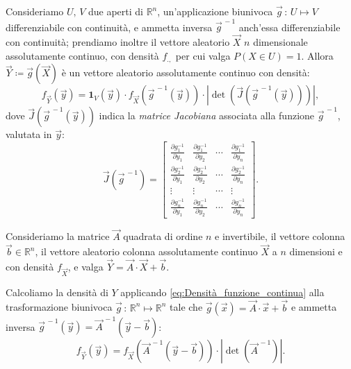         \begin{prty}\label{prty:Densità_funzione_continua}
            Consideriamo $U,\,V$ due aperti di $\mathbb{R}^n$, 
            un'applicazione biunivoca $\vec{g}\,:\, U \mapsto V$ differenziabile con continuità, 
            e ammetta inversa $\vec{g}^{\,-1}$ anch'essa differenziabile con continuità; 
            prendiamo inoltre il vettore aleatorio $\vec{X}$ $n$ \nbdash dimensionale assolutamente continuo, 
            con densità $f_{.,}$ per cui valga $P(X \in U) = 1$. Allora $\vec{Y} \coloneqq \vec{g}(\vec{X})$ è un
            vettore aleatorio assolutamente continuo con densità:
            \begin{equation}\label{eq:Densità_funzione_continua}
                f_{\vec{Y}}(\vec{y}) = \mathbf{1}_{V}(\vec{y}) \cdot 
                f_{\vec{X}}\left(\vec{g}^{\,-1}(\vec{y})\right) \cdot 
                \left|\det\left(\vec{J}\left(\vec{g}^{\,-1}(\vec{y})\right)\right)\right|
            ,\end{equation}
            dove $\vec{J}(\vec{g}^{\,-1}(\vec{y}))$ indica la \textit{matrice Jacobiana} associata alla 
            funzione $\vec{g}^{\,-1}$, valutata in $\vec{y}$: \[
                \vec{J}(\vec{g}^{\,-1}) = \begin{bmatrix}
                    \frac{\partial g_1^{-1}}{\partial y_1} & \frac{\partial g_1^{-1}}{\partial y_2} & \cdots & \frac{\partial g_1^{-1}}{\partial y_n}\\
                    \frac{\partial g_2^{-1}}{\partial y_1} & \frac{\partial g_2^{-1}}{\partial y_2} & \cdots & \frac{\partial g_2^{-1}}{\partial y_n}\\
                    \vdots & \vdots & \cdots & \vdots\\
                    \frac{\partial g_n^{-1}}{\partial y_1} & \frac{\partial g_n^{-1}}{\partial y_2} & \cdots & \frac{\partial g_n^{-1}}{\partial y_n}
                \end{bmatrix}
            .\]
        \end{prty}
        \begin{defn}
            Consideriamo la matrice $\vec{A}$ quadrata di ordine $n$ e invertibile, 
            il vettore colonna $\vec{b} \in \mathbb{R}^n$, il vettore aleatorio colonna assolutamente 
            continuo $\vec{X}$ a $n$ dimensioni e con densità $f_{\vec{X}}$, e valga 
            $\vec{Y} = \vec{A} \cdot \vec{X} + \vec{b}$.

            Calcoliamo la densità di $Y$ applicando \eqref{eq:Densità_funzione_continua} alla trasformazione 
            biunivoca $\vec{g}\,:\, \mathbb{R}^n \mapsto \mathbb{R}^n$ tale che $\vec{g}(\vec{x}) = \vec{A} \cdot \vec{x} + \vec{b}$ e ammetta inversa $\vec{g}^{\,-1}(\vec{y}) = \vec{A}^{\,-1}(\vec{y} - \vec{b})$:
            \begin{equation}\label{eq:Trasformazioni_vettori_continui}
                f_{\vec{Y}}(\vec{y}) = f_{\vec{X}}\left(\vec{A}^{\,-1}(\vec{y} - \vec{b})\right) \cdot 
                \left|\det(\vec{A}^{\,-1})\right|
            .\end{equation}
        \end{defn}
